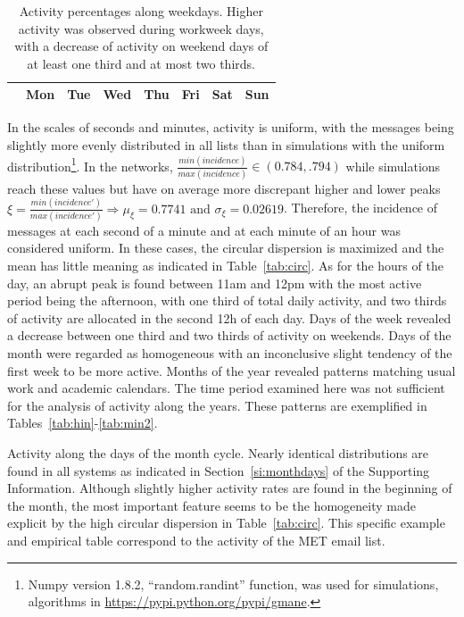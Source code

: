 \documentclass[%
aip,
jmp,%
amsmath,amssymb,
reprint,%
]{revtex4-1}
\begin{document}
\begin{table}
\caption{Activity percentages along weekdays.
Higher activity was observed during workweek days, with a decrease of activity on weekend days of at least one third and at most two thirds.}
\begin{center}
\begin{tabular}{ | l ||  c | c | c | c | c |   c | c |}
\hline
& Mon & Tue & Wed & Thu & Fri & Sat & Sun  \\ \hline

\end{tabular}
\end{center}
\label{tab:win}
\end{table}

In the scales of seconds and minutes, activity is uniform,
with the messages being slightly more evenly distributed in all lists than in simulations with the uniform distribution\footnote{Numpy version 1.8.2, ``random.randint'' function, was used for simulations, algorithms in \url{https://pypi.python.org/pypi/gmane}.}.
In the networks, $\frac{min(incidence)}{max(incidence)} \in (0.784,.794)$ while simulations reach these values but have on average more discrepant higher and lower peaks $\xi=\frac{min(incidence')}{max(incidence')} \Rightarrow \mu_\xi=0.7741 \text{ and } \sigma_\xi=0.02619$.
Therefore, the incidence of messages at each second of a minute and at each minute of an hour was considered uniform.
In these cases, the circular dispersion is maximized and the mean has little meaning as indicated in Table~\ref{tab:circ}.
As for the hours of the day, an abrupt peak is found between 11am and 12pm with the most active period being the afternoon, with one third of total daily activity, and two thirds of activity are allocated in the second 12h of each day. Days of the week revealed a decrease between one third and two thirds of activity on weekends.
Days of the month were regarded as homogeneous with an inconclusive slight tendency of the first week to be more active.
Months of the year revealed patterns matching usual work and academic calendars. The time period examined here was not sufficient for the analysis of activity along the years. These patterns are exemplified in Tables~\ref{tab:hin}-\ref{tab:min2}.


\FloatBarrier

\begin{table}
\caption{Activity along the days of the month cycle.
Nearly identical distributions are found in all systems
as indicated in Section~\ref{si:monthdays} of the Supporting Information. Although slightly higher activity rates are found in the beginning of the month, the most important feature seems to be the homogeneity made explicit by the high circular dispersion in Table~\ref{tab:circ}.
This specific example and empirical table correspond to the activity of the MET email list.}
\footnotesize

\label{tab:min}
\end{table}
\end{document}

